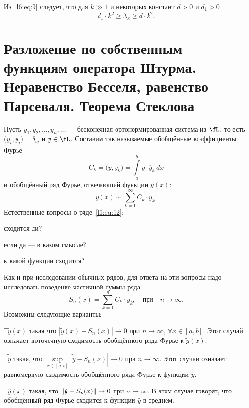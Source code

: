 Из~\eqref{l6:eq:9} следует, что для $k\gg1$ и некоторых констант $d>0$ и $d_1>0$  
\begin{equation}
	\label{l6:eq:10}
	d_1\cdot k^2\geqslant\lambda_k\geqslant d\cdot k^2.
\end{equation} 
\section[Разложение по собственным функциям оператора Штурма]{Разложение по собственным функциям оператора Штурма. Неравенство Бесселя, равенство Парсеваля. Теорема Стеклова}
\label{lecture6section2}
Пусть $y_1,y_2,\ldots,y_n,\ldots$ --- бесконечная ортонормированная система из $\fL$, то есть $\big(y_i,y_j\big)=\delta_{ij}$ и $y\in\fL$. Составим так называемые обобщённые коэффициенты Фурье 
\begin{equation}
	\label{l6:eq:11}
	 C_k=\big(y,y_k\big)=\int\limits_a^b y\cdot\overline{y}_k\,dx
\end{equation}
и обобщённый ряд Фурье, отвечающий функции $y(x)$:
\begin{equation}
	\label{l6:eq:12}
	 y(x)\sim\sum\limits_{k=1}^{\infty}C_k\cdot y_k.
\end{equation}
Естественные вопросы о ряде~\eqref{l6:eq:12}{\mb:}
\begin{enumerate1}
	\item сходится ли?
	\item если да --- в каком смысле?
	\item к какой функции сходится?
\end{enumerate1}

Как и при исследовании обычных рядов{\mb,} для ответа на эти вопросы надо исследовать поведение частичной суммы ряда
\begin{equation*}
	 S_n(x)=\sum\limits_{k=1}^n C_k\cdot y_k,\quad\text{при}\quad n\to \infty.
\end{equation*}
Возможны следующие варианты{\mb:}
\begin{enumerate1}
	\item $\exists\tilde{y}(x)$ такая что $|\tilde{y}(x)-S_n(x)|\to0$ при $n\to\infty$, $\forall x\in[a,b]$. Этот случай означает поточечную сходимость обобщённого ряда Фурье к $\tilde{y}(x)$.
	\item$\exists\tilde{\tilde{y}}$ такая, что $\sup\limits_{x\in[a,b]}\left|\tilde{\tilde{y}}-S_n(x)\right|\to0$ при $n\to\infty$. Этот случай означает равномерную сходимость обобщённого ряда Фурье к функции $\tilde{\tilde{y}}$.
	\item $\exists\hat{y}(x)$ такая, что $\left\|\hat{y}-S_n(x)\right\|\to0$ при $n\to\infty$. В этом случае говорят, что обобщённый ряд Фурье сходится к функции $\hat{y}$ в среднем.
\end{enumerate1} 

